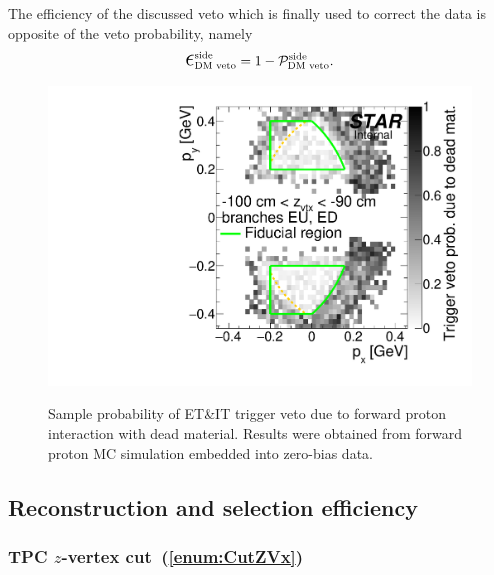 The efficiency of the discussed veto which is finally used to correct the data is opposite of the veto probability, namely
\begin{equation}
 \mbox{\LARGE$\epsilon$}_{\text{DM~veto}}^{\text{side}} = 1 - \mathcal{P}_{\text{DM~veto}}^{\text{side}}.
\end{equation}


\begin{figure}[ht!]
\centering%
\parbox{0.4725\textwidth}{%
  \centering%
  \includegraphics[width=\linewidth,page=3]{graphics/corrections/mcDeadMatProbPxPy.pdf}\label{fig:sampleDeadMatVetoProb}
}%
\quad%
\parbox{0.4725\textwidth}{%
    \caption[Sample probability of ET\&IT trigger veto due to forward proton interaction with dead material.]{Sample probability of ET\&IT trigger veto due to forward proton interaction with dead material. Results were obtained from forward proton MC simulation embedded into zero-bias data.}\label{fig:sampleRpDeadMatVeto}%
}
\end{figure}





\subsection{Reconstruction and selection efficiency}\label{sec:cutsEff}
\subsubsection{TPC \texorpdfstring{$z$}{z}-vertex cut~(\ref{enum:CutZVx})}

